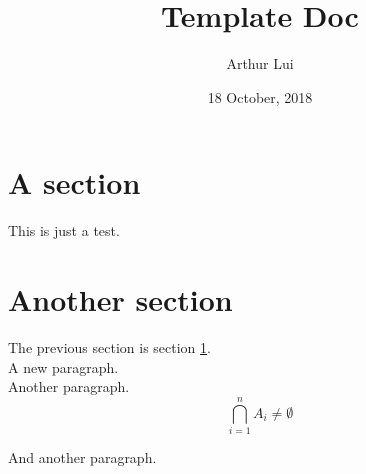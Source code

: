 \documentclass[12pt]{asaproc} %
\title{Template Doc}
\author{Arthur Lui}
\date{18 October, 2018} %
\begin{document}
\maketitle
{}


\section{A section}\label{sec:a-section} %
This is just a test.

\section{Another section}\label{sec:another-section}
The previous section is section \ref{sec:a-section}. \\

A new paragraph. \\

Another paragraph. \\

$$
\bigcap_{i=1}^n A_i \ne \emptyset
$$

And another paragraph.
\end{document}
